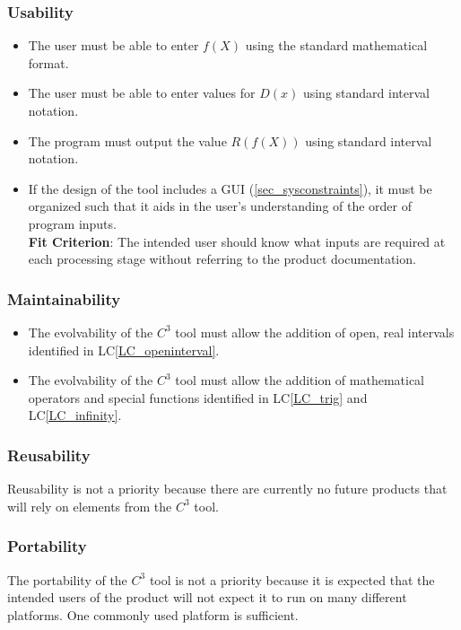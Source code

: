 \documentclass[12pt]{article}
\newcommand{\lcref}[1]{LC\ref{#1}}
\newcommand{\prognameAbbrv}{$C^{3}$}
\begin{document}
\subsubsection*{Usability}
\begin{itemize}
	\item The user must be able to enter $f(X)$ using the standard mathematical 
	format.
	\item The user must be able to enter values for $D(x)$ using standard 
	interval notation.
	\item The program must output the value $R(f(X))$ using standard interval 
	notation.
	\item If the design of the tool includes a GUI (\ref{sec_sysconstraints}), 
	it must be organized such that it aids in the user's understanding of the 
	order of program inputs.\\\textbf{Fit Criterion}: The intended user should 
	know what inputs are required at each processing stage without referring to 
	the product documentation.
\end{itemize}

\subsubsection*{Maintainability}
\begin{itemize}
	\item The evolvability of the \prognameAbbrv{} tool must allow the addition 
	of open, real intervals identified in \lcref{LC_openinterval}.
	\item The evolvability of the \prognameAbbrv{} tool must allow the addition 
	of mathematical operators and special functions identified in 
	\lcref{LC_trig} and \lcref{LC_infinity}.
\end{itemize}

\subsubsection*{Reusability}
Reusability is not a priority because there are currently no future products 
that will rely on elements from the \prognameAbbrv{} tool.

\subsubsection*{Portability}
The portability of the \prognameAbbrv{} tool is not a priority because it is 
expected that the intended users of the product will not expect it to run on 
many different platforms. One commonly used platform is sufficient.
\end{document}
